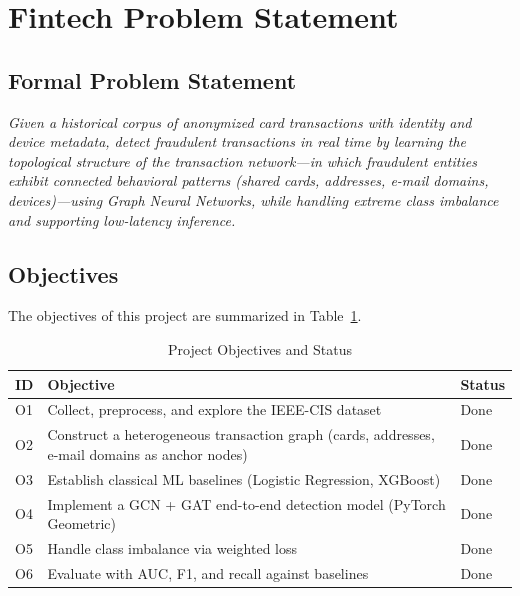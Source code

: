 \documentclass[conference]{IEEEtran}
\begin{document}
\section{Fintech Problem Statement}
\subsection{Formal Problem Statement}
\textit{Given a historical corpus of anonymized card transactions with
identity and device metadata, detect fraudulent transactions in real time
by learning the topological structure of the transaction network---in which
fraudulent entities exhibit connected behavioral patterns (shared cards,
addresses, e-mail domains, devices)---using Graph Neural Networks, while
handling extreme class imbalance and supporting low-latency inference.}

\subsection{Objectives}
The objectives of this project are summarized in Table~\ref{tab:objectives}.

\begin{table}[htbp]
\caption{Project Objectives and Status}
\label{tab:objectives}
\centering
\footnotesize
\begin{tabular}{p{0.7cm}p{5.2cm}p{1.2cm}}
\hline
\textbf{ID} & \textbf{Objective} & \textbf{Status} \\
\hline
O1 & Collect, preprocess, and explore the IEEE-CIS dataset & Done \\
O2 & Construct a heterogeneous transaction graph (cards, addresses,
     e-mail domains as anchor nodes) & Done \\
O3 & Establish classical ML baselines (Logistic Regression, XGBoost) & Done \\
O4 & Implement a GCN + GAT end-to-end detection model (PyTorch Geometric) & Done \\
O5 & Handle class imbalance via weighted loss & Done \\
O6 & Evaluate with AUC, F1, and recall against baselines & Done \\
\hline
\end{tabular}
\end{table}
\end{document}
